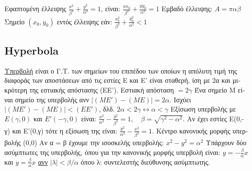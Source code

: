 \documentclass[12pt]{article}
\begin{document}
\begin{flushleft}
	\textbullet \quad \textgreek{Εφαπτομένη έλλειψης} $\displaystyle \frac{x^2}{\beta^2} + \frac{y^2}{\alpha^2} = 1$, \textgreek{είναι}: $ \frac{xx_0}{\beta^2} + \frac{yy_0}{\alpha^2} = 1$ \linebreak 
	\textbullet \quad \textgreek{Εμβαδό έλλειψης:} $A = \pi \alpha \beta$ \linebreak 
	\textbullet \quad \textgreek{Σημείο} $(x_0, y_0)$ \textgreek{εντός έλλειψης εάν}: $\displaystyle \frac{x_0^2}{\beta^2} + \frac{y_0^2}{\alpha^2} < 1 $ \linebreak 
	
	\subsection{Hyperbola} 
	
	\textbullet \quad \uline{\textgreek{Υπερβολή}} \textgreek{είναι ο Γ.Τ. των σημείων του επιπέδου των οποίων η απόλυτη τιμή της διαφοράς των αποστάσεων από τις εστίες Ε και Ε' είναι σταθερή, ίση με 2α και μικρότερη της εστιακής απόστασης (ΕΕ')}. \linebreak 
	\textbullet \quad \textgreek{Εστιακή απόσταση} $= 2\gamma$ \linebreak 
	\textbullet \quad \textgreek{Ένα σημείο Μ είναι σημείο της υπερβολής ανν} $\displaystyle  \left| (ME') -(ME) \right| = 2\alpha $. \linebreak 
	\textbullet \quad \textgreek{Ισχύει} $ \left| (ME') -(ME) \right| < (EE')$, \textgreek{δλδ.} $\displaystyle 2\alpha < 2\gamma \leftrightarrow \alpha < \gamma $ \linebreak 
	\textbullet \quad \textgreek{Εξίσωση υπερβολής με} $E(\gamma, 0)$ \textgreek{και} $E'(-\gamma, 0)$ \textgreek{είναι}: $\displaystyle \frac{x^2}{\alpha^2} - \frac{y^2}{\beta^2} = 1, \quad \beta = \sqrt{\gamma^2 -\alpha^2} $. \textgreek{Αν έχει εστίες Ε(0,-γ) και Ε'(0,γ) τότε η εξίσωση της είναι:} $ \frac{y^2}{\alpha^2} -\frac{x^2}{\beta^2} = 1$. \textgreek{Κέντρο κανονικής μορφής υπερβολής (0,0)} \linebreak 
	\textbullet \quad \textgreek{Αν α = β έχουμε την ισοσκελής υπερβολής:} $x^2 -y^2 = \alpha^2 $ \linebreak 
	\textbullet \quad \textgreek{Υπάρχουν δύο ασύμπτωτες της υπερβολής, όπου για την κανονικής μορφής υπερβολή είναι}: $ y= -\frac{\beta}{\alpha} x $ \textgreek{και} $y = \frac{\beta}{\alpha} x $ \uline{\textgreek{ανν}} $\displaystyle |\lambda| < \beta / \alpha$ \textgreek{όπου λ: συντελεστής διεύθυνσης ασύμπτωτης.} \linebreak 

\end{flushleft}
\end{document}
